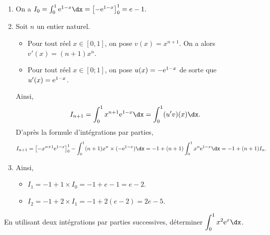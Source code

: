 \documentclass[11pt,fleqn, openany]{book} %
\begin{document}
\begin{solution}\hspace{0pt}
\begin{enumerate}
\item  On a \(I_0=\int_0^1\e^{1-x}\dx=\left[-\e^{1-x}\right]_0^1=e-1.\)
\item  Soit \(n\) un entier naturel.

\begin{itemize}
\item  Pour tout réel \(x\in [0,1]\), on pose \(v(x)=x^{n+1}\). On a alors \(v'(x)=(n+1)x^{n}\).
\item  Pour tout réel \(x\in [0;1]\), on pose \(u(x)=-\mathrm{e}^{1-x}\) de sorte que \(u'(x)=\mathrm{e}^{1-x}\).
\end{itemize}
Ainsi, 
\[I_{n+1}=\int_0^1x^{n+1}\e^{1-x}\dx=\int_{0}^1 (u'v)(x)\dx.\]
D'après la formule d'intégrations par parties,
\[ I_{n+1}= \left[-x^{n+1}\e^{1-x}\right]_0^1-\int_0^1 (n+1)x^n \times (-\e^{1-x})\dx=-1+(n+1)\int_0^1x^n\e^{1-x}\dx=-1+(n+1)I_n.\]
\item  Ainsi,
\begin{itemize}
\item  \(I_1=-1+1\times I_0=-1+e-1=e-2\).
\item  \(I_2=-1+2\times I_1 = -1+2(e-2)=2e-5\).
\end{itemize}
\end{enumerate}\end{solution}


\begin{exercise}En utilisant deux intégrations par parties successives, déterminer $\displaystyle\int_0^1x^2\e^x\dx$.\end{exercise}
\end{document}
